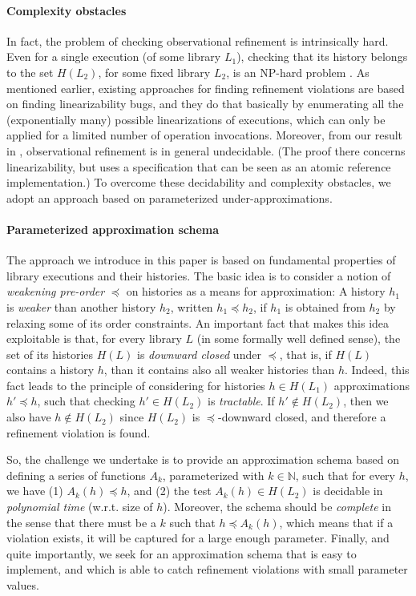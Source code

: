 \paragraph{Complexity obstacles}

In fact, the problem of checking observational refinement is intrinsically
hard. Even for a single execution (of some library $L_1$), checking that its
history belongs to the set $H(L_2)$, for some fixed library $L_2$, is an
NP-hard problem \cite{}. As mentioned earlier, existing approaches for finding
refinement violations are based on finding linearizability bugs, and they do
that basically by enumerating all the (exponentially many) possible
linearizations of executions, which can only be applied for a limited number of
operation invocations. Moreover, from our result in \cite{}, observational
refinement is in general undecidable. (The proof there concerns
linearizability, but uses a specification that can be seen as an atomic
reference implementation.) To overcome these decidability and complexity
obstacles, we adopt an approach based on parameterized under-approximations.

\paragraph{Parameterized approximation schema}

The approach we introduce in this paper is based on fundamental properties of
library executions and their histories. The basic idea is to consider a notion
of \emph{weakening pre-order} $\preceq$ on histories as a means for
approximation: A history $h_1$ is \emph{weaker} than another history $h_2$,
written $h_1 \preceq h_2$, if $h_1$ is obtained from $h_2$ by relaxing some of
its order constraints. An important fact that makes this idea exploitable is
that, for every library $L$ (in some formally well defined sense), the set of
its histories $H(L)$ is \emph{downward closed} under $\preceq$, that is, if
$H(L)$ contains a history $h$, than it contains also all weaker histories than
$h$. Indeed, this fact leads to the principle of considering for histories $h
\in H(L_1)$ approximations $h' \preceq h$, such that checking $h' \in H(L_2)$
is \emph{tractable}. If $h' \not\in H(L_2)$, then we also have $h \not\in
H(L_2)$ since $H(L_2)$ is $\preceq$-downward closed, and therefore a refinement
violation is found.

So, the challenge we undertake is to provide an approximation schema based on
defining a series of functions $A_k$, parameterized with $k \in \mathbb{N}$,
such that for every $h$, we have (1) $A_k (h) \preceq h$, and (2) the test
$A_k(h) \in H(L_2)$ is decidable in \emph{polynomial time} (w.r.t. size of $h$).
Moreover, the schema should be \emph{complete} in the sense that there must be a
$k$ such that $h \preceq A_k(h)$, which means that if a violation exists, it
will be captured for a large enough parameter. Finally, and quite importantly,
we seek for an approximation schema that is easy to implement, and which is
able to catch refinement violations with small parameter values.

